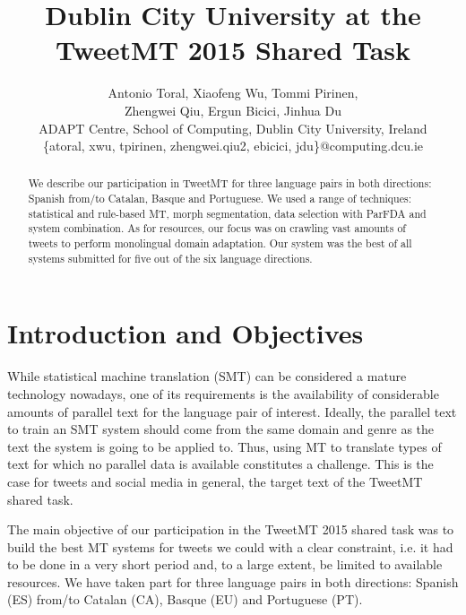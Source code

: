 \documentclass[postprint]{flammie}
\title{Dublin City University at the TweetMT 2015 Shared Task\footnotepubrights{
The real publication is in TweetMT 2015. in SEPLN 2015.
The version you see here does not include the Spanish translations.}}%
\author {
Antonio Toral, Xiaofeng Wu, Tommi Pirinen,\\
Zhengwei Qiu, Ergun Bicici, Jinhua Du\\
ADAPT Centre, School of Computing, Dublin City University, Ireland\\
\{atoral, xwu, tpirinen, zhengwei.qiu2, ebicici, jdu\}@computing.dcu.ie}
\begin{document}



\label{firstpage} \maketitle

%

\begin{abstract}
We describe our participation in TweetMT for three language pairs in both directions: Spanish from/to Catalan, Basque and Portuguese.
We used a range of techniques: statistical and rule-based MT, morph segmentation, data selection with ParFDA and system combination.
As for resources, our focus was on crawling vast amounts of tweets to perform monolingual domain adaptation.
Our system was the best of all systems submitted for five out of the six language directions.
\end{abstract}




\section{Introduction and Objectives}

While statistical machine translation (SMT) can be considered a mature technology nowadays, one of its requirements is the availability of considerable amounts of parallel text for the language pair of interest.
Ideally, the parallel text to train an SMT system should come from the same domain and genre as the text the system is going to be applied to.
Thus, using MT to translate types of text for which no parallel data is available constitutes a challenge.
This is the case for tweets and social media in general, the target text of the TweetMT shared task.

The main objective of our participation in the TweetMT 2015 shared task was to build the best MT systems for tweets we could with a clear constraint, i.e. it had to be done in a very short period and, to a large extent, be limited to available resources.
We have taken part for three language pairs in both directions: Spanish (ES) from/to Catalan (CA), Basque (EU) and Portuguese (PT).
\end{document}
